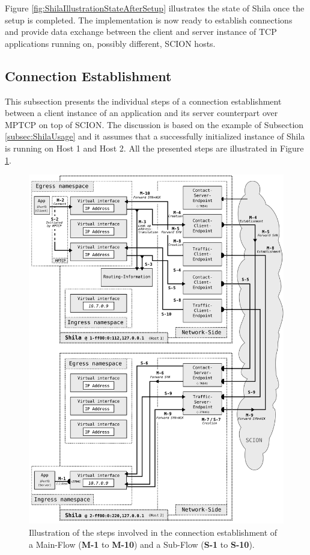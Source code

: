 Figure \ref{fig:ShilaIllustrationStateAfterSetup} illustrates the state of Shila once the setup is completed. The implementation is now ready to establish connections and provide data exchange between the client and server instance of TCP applications running on, possibly different, SCION hosts. 

\subsection*{Connection Establishment}
\label{subsec:ShilaConnectionEstablishment}

This subsection presents the individual steps of a connection establishment between a client instance of an application and its server counterpart over MPTCP on top of SCION. The discussion is based on the example of Subsection \ref{subsec:ShilaUsage} and it assumes that a successfully initialized instance of Shila is running on Host 1 and Host 2. All the presented steps are illustrated in Figure \ref{fig:ShilaIllustrationConnectionEstablishment}. 

\begin{figure}
	\begin{center}
		\def\svgwidth{1\textwidth}
		\includegraphics[scale=0.2]{../illustrations/shilaIntroduction/ConnectionEstablishment.pdf}   
		\caption[]{Illustration of the steps involved in the connection establishment of a Main-Flow (\textbf{M-1} to \textbf{M-10}) and a Sub-Flow (\textbf{S-1} to \textbf{S-10}).}
		\label{fig:ShilaIllustrationConnectionEstablishment}
	\end{center}
\end{figure}


